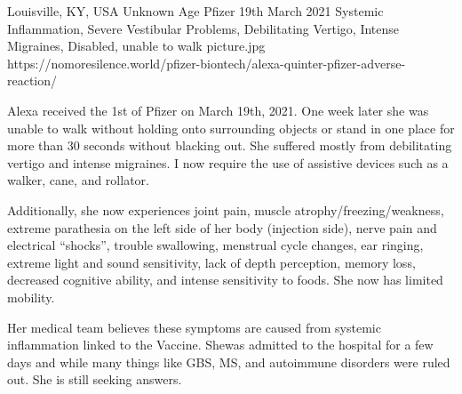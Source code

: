 {Louisville, KY, USA}
{Unknown Age}
{Pfizer }
{19th March 2021}
{Systemic Inflammation, Severe Vestibular Problems, Debilitating Vertigo, Intense Migraines, Disabled, unable to walk}
{picture.jpg}
{https://nomoresilence.world/pfizer-biontech/alexa-quinter-pfizer-adverse-reaction/}
{

Alexa received the 1st of Pfizer on March 19th, 2021. One week later she was
unable to walk without holding onto surrounding objects or stand in one place
for more than 30 seconds without blacking out. She suffered mostly from
debilitating vertigo and intense migraines. I now require the use of assistive
devices such as a walker, cane, and rollator.

Additionally, she now experiences joint pain, muscle atrophy/freezing/weakness,
extreme parathesia on the left side of her body (injection side), nerve pain and
electrical “shocks”, trouble swallowing, menstrual cycle changes, ear ringing,
extreme light and sound sensitivity, lack of depth perception, memory loss,
decreased cognitive ability, and intense sensitivity to foods. She now has
limited mobility.

Her medical team believes these symptoms are caused from systemic inflammation
linked to the Vaccine. Shewas admitted to the hospital for a few days and while
many things like GBS, MS, and autoimmune disorders were ruled out. She is still
seeking answers.

}
